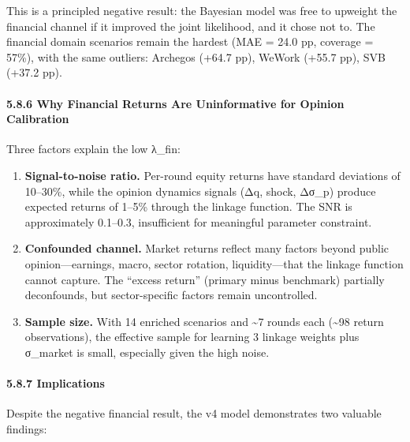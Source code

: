 \documentclass[
]{article}
\begin{document}
This is a principled negative result: the Bayesian model was free to
upweight the financial channel if it improved the joint likelihood, and
it chose not to. The financial domain scenarios remain the hardest (MAE
= 24.0 pp, coverage = 57\%), with the same outliers: Archegos (+64.7
pp), WeWork (+55.7 pp), SVB (+37.2 pp).

\paragraph{5.8.6 Why Financial Returns Are Uninformative for Opinion
Calibration}\label{why-financial-returns-are-uninformative-for-opinion-calibration}

Three factors explain the low λ\_fin:

\begin{enumerate}
\def\labelenumi{\arabic{enumi}.}
\item
  \textbf{Signal-to-noise ratio.} Per-round equity returns have standard
  deviations of 10--30\%, while the opinion dynamics signals (Δq, shock,
  Δσ\_p) produce expected returns of 1--5\% through the linkage
  function. The SNR is approximately 0.1--0.3, insufficient for
  meaningful parameter constraint.
\item
  \textbf{Confounded channel.} Market returns reflect many factors
  beyond public opinion---earnings, macro, sector rotation,
  liquidity---that the linkage function cannot capture. The ``excess
  return'' (primary minus benchmark) partially deconfounds, but
  sector-specific factors remain uncontrolled.
\item
  \textbf{Sample size.} With 14 enriched scenarios and \textasciitilde7
  rounds each (\textasciitilde98 return observations), the effective
  sample for learning 3 linkage weights plus σ\_market is small,
  especially given the high noise.
\end{enumerate}

\paragraph{5.8.7 Implications}\label{implications}

Despite the negative financial result, the v4 model demonstrates two
valuable findings:
\end{document}
